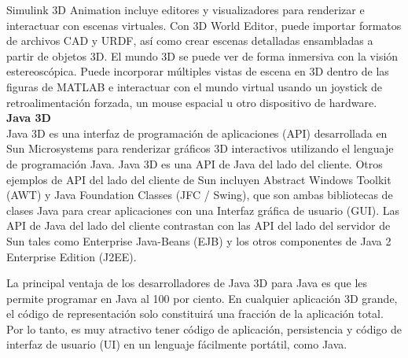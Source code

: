 Simulink 3D Animation incluye editores y visualizadores para renderizar e interactuar con escenas virtuales. Con 3D World Editor, puede importar formatos de archivos CAD y URDF, así como crear escenas detalladas ensambladas a partir de objetos 3D. El mundo 3D se puede ver de forma inmersiva con la visión estereoscópica. Puede incorporar múltiples vistas de escena en 3D dentro de las figuras de MATLAB e interactuar con el mundo virtual usando un joystick de retroalimentación forzada, un mouse espacial u otro dispositivo de hardware. \cite{mathw-2018} \\

\textbf{Java 3D}\\
Java 3D es una interfaz de programación de aplicaciones (API) desarrollada en Sun Microsystems para renderizar gráficos 3D interactivos utilizando el lenguaje de programación Java. Java 3D es una API de Java del lado del cliente. Otros ejemplos de API del lado del cliente de Sun incluyen Abstract Windows Toolkit (AWT) y Java Foundation Classes (JFC / Swing), que son ambas bibliotecas de clases Java para crear aplicaciones con una Interfaz gráfica de usuario (GUI). Las API de Java del lado del cliente contrastan con las API del lado del servidor de Sun tales como Enterprise Java-Beans (EJB) y los otros componentes de Java 2 Enterprise Edition (J2EE). 

La principal ventaja de los desarrolladores de Java 3D para Java es que les permite programar en Java al 100 por ciento. En cualquier aplicación 3D grande, el código de representación solo constituirá una fracción de la aplicación total. Por lo tanto, es muy atractivo tener código de aplicación, persistencia y código de interfaz de usuario (UI) en un lenguaje fácilmente portátil, como Java. \cite{selman-2002}\\

